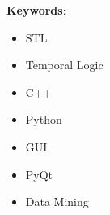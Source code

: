 \textbf{Keywords}:
\begin{itemize}
\item STL
\item Temporal Logic
\item C++
\item Python
\item GUI
\item PyQt
\item Data Mining
\end{itemize}